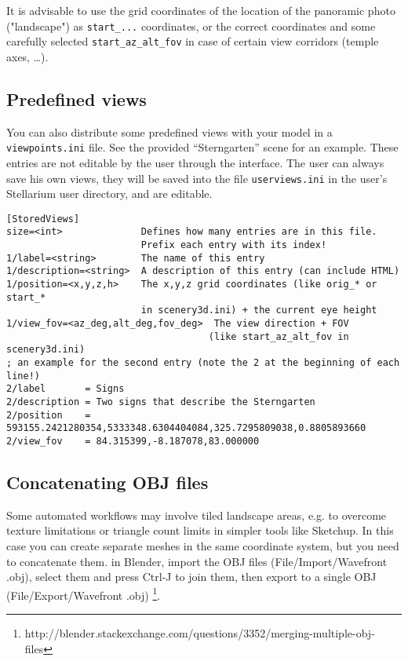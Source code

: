 \documentclass[a4paper]{article}
\newcommand{\filename}[1]{\texttt{#1}}
\begin{document}
It is advisable to use the grid coordinates of the location of the panoramic
photo ("landscape") as \verb|start_...| coordinates, or the correct coordinates
and some carefully selected \texttt{start\_az\_alt\_fov} in case of certain view
corridors (temple axes, \ldots).

\subsection{Predefined views}
You can also distribute some predefined views with your model in a
\filename{viewpoints.ini} file. See the provided ``Sterngarten'' scene for an
example. These entries are not editable by the user through the interface. The
user can always save his own views, they will be saved into the file
\filename{userviews.ini} in the user's Stellarium user directory, and are editable.

\begin{verbatim}
[StoredViews]
size=<int>              Defines how many entries are in this file. 
                        Prefix each entry with its index!
1/label=<string>        The name of this entry
1/description=<string>  A description of this entry (can include HTML)
1/position=<x,y,z,h>    The x,y,z grid coordinates (like orig_* or start_*
                        in scenery3d.ini) + the current eye height
1/view_fov=<az_deg,alt_deg,fov_deg>  The view direction + FOV
                                    (like start_az_alt_fov in scenery3d.ini)
; an example for the second entry (note the 2 at the beginning of each line!)
2/label       = Signs
2/description = Two signs that describe the Sterngarten
2/position    = 593155.2421280354,5333348.6304404084,325.7295809038,0.8805893660
2/view_fov    = 84.315399,-8.187078,83.000000
\end{verbatim}

\subsection{Concatenating OBJ files}
\label{sec:concatenating}

Some automated workflows may involve tiled landscape areas, e.g. to
overcome texture limitations or triangle count limits in simpler tools
like Sketchup. In this case you can create separate meshes in the same
coordinate system, but you need to concatenate them. in Blender, import
the OBJ files (File/Import/Wavefront .obj), select them and press
Ctrl-J to join them, then export to a single OBJ
(File/Export/Wavefront .obj)%
\footnote{http://blender.stackexchange.com/questions/3352/merging-multiple-obj-files}.
\end{document}
